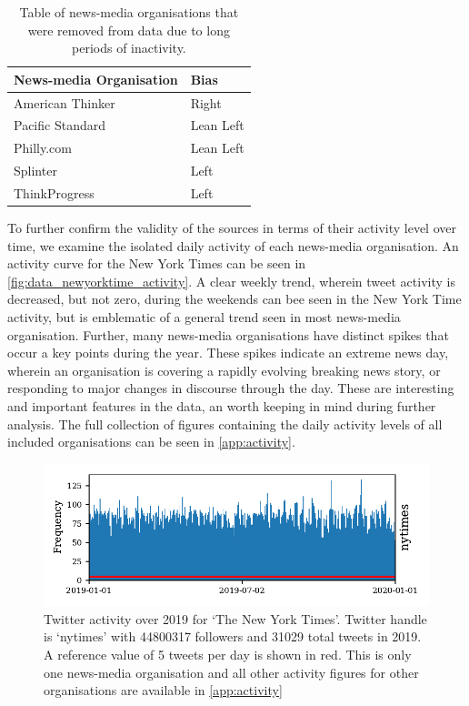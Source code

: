 \begin{table}
	\centering
	\begin{tabular}{ll}
		\toprule
		News-media Organisation &    Bias \\
		\midrule
		American Thinker  &      Right \\
		Pacific Standard &  Lean Left \\
		Philly.com  &  Lean Left \\
		Splinter &       Left \\
		ThinkProgress  &       Left \\
		\bottomrule
	\end{tabular}
	\caption{Table of news-media organisations that were removed from data due to long periods of inactivity.}
	\label{tab:data_removed_inactive_period}
\end{table}


To further confirm the validity of the sources in terms of their activity level over time, we examine the isolated daily activity of each news-media organisation. An activity curve for the New York Times can be seen in \autoref{fig:data_newyorktime_activity}. 
A clear weekly trend, wherein tweet activity is decreased, but not zero, during the weekends can bee seen in the New York Time activity, but is emblematic of a general trend seen in most news-media organisation. Further, many news-media organisations have distinct spikes that occur a key points during the year. These spikes indicate an extreme news day, wherein an organisation is covering a rapidly evolving breaking news story, or responding to major changes in discourse through the day. These are interesting and important features in the data, an worth keeping in mind during further analysis. The full collection of figures containing the daily activity levels of all included organisations can be seen in \autoref{app:activity}.

\begin{figure}
\centering
	\includegraphics{appendix2/figs/tweet_times/nytimes.pdf}
	\caption{Twitter activity over 2019 for `The New York Times'.
		Twitter handle is `nytimes' with 44800317 followers and 31029 total tweets in 2019. A reference value of 5 tweets per day is shown in red. This is only one news-media organisation and all other activity figures for other organisations are available in \autoref{app:activity}}
	\label{fig:data_newyorktime_activity}
\end{figure}

